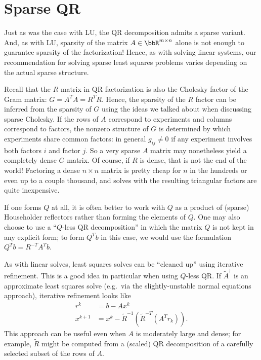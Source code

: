 \section{Sparse QR}

Just as was the case with LU, the QR decomposition admits a sparse
variant.  And, as with LU, sparsity of the
matrix $A \in \bbR^{m \times n}$ alone is not
enough to guarantee sparsity of the factorization!  Hence, as with
solving linear systems, our recommendation for solving sparse least
squares problems varies depending on the actual sparse structure.

Recall that the $R$ matrix in QR factorization is also the Cholesky
factor of the Gram matrix: $G = A^T A = R^T R$.  Hence, the sparsity of
the $R$ factor can be inferred from the sparsity of $G$ using the ideas
we talked about when discussing sparse Cholesky.  If the rows of $A$
correspond to experiments and columns correspond to factors, the nonzero
structure of $G$ is determined by which experiments share common
factors: in general $g_{ij} \neq 0$ if any experiment involves both
factors $i$ and factor $j$. So a very sparse $A$ matrix may nonetheless
yield a completely dense $G$ matrix. Of course, if $R$ is dense, that is
not the end of the world!  Factoring a dense $n \times n$ matrix is
pretty cheap for $n$ in the hundreds or even up to a couple thousand,
and solves with the resulting triangular factors are quite inexpensive.

If one forms $Q$ at all, it is often better to work with $Q$ as a
product of (sparse) Householder reflectors rather than forming the
elements of $Q$.  One may also choose to use a ``$Q$-less QR decomposition''
in which the matrix $Q$ is not kept in any explicit form; to form $Q^T b$
in this case, we would use the formulation $Q^T b = R^{-T} A^T b$.

As with linear solves, least squares solves can be ``cleaned up''
using iterative refinement.  This is a good idea in particular when
using $Q$-less QR.  If $\tilde{A}^\dagger$ is an approximate least
squares solve (e.g.~via the slightly-unstable normal equations approach),
iterative refinement looks like
\begin{align*}
  r^{k} &= b-Ax^{k} \\
  x^{k+1} &= x^k - \tilde{R}^{-1} (\tilde{R}^{-T} (A^T r_k)).
\end{align*}
This approach can be useful even when $A$ is moderately large and dense;
for example, $\tilde{R}$ might be computed from a (scaled) QR
decomposition of a carefully selected subset of the rows of $A$.
